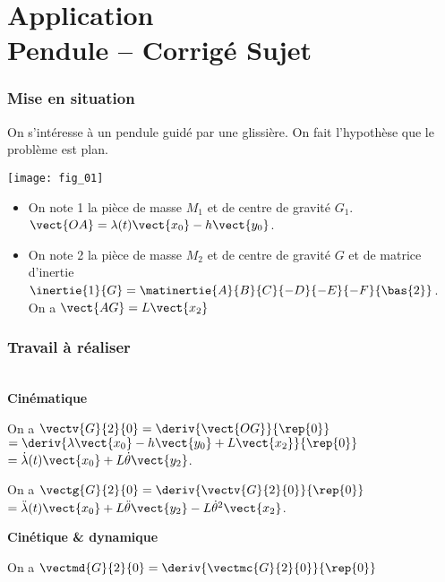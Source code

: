 \chapter*{Application  \\ 
Pendule -- \ifprof Corrigé \else Sujet \fi}

\iflivret {} \else
\ifprof  {} \else \fi
\fi

\setcounter{question}{0}
\marginnote{}



\subsection*{Mise en situation}
On s'intéresse à un pendule guidé par une glissière. On fait l'hypothèse que le problème est plan. 

\begin{marginfigure}
\texttt{[image: fig\_01]}
\end{marginfigure}

\begin{itemize}
\item On note 1 la pièce de masse $M_1$ et de centre de gravité $G_1$. $\vect{OA}=\lambda(t)\vect{x_0}-h\vect{y_0}$.
\item On note 2 la pièce de masse $M_2$ et de centre de gravité $G$ et de matrice d'inertie $\inertie{1}{G}= \matinertie{A}{B}{C}{-D}{-E}{-F}{\bas{2}}$. On a $\vect{AG}=L\vect{x_2}$
\end{itemize}

\subsection*{Travail à réaliser}

\ifprof
\begin{corrige}
~\\

\textbf{Cinématique}

On a $\vectv{G}{2}{0}=\deriv{\vect{OG}}{\rep{0}} $ 
$=\deriv{\lambda\vect{x_0}-h\vect{y_0}+L\vect{x_2}}{\rep{0}}$ 
$=\dot{\lambda}(t)\vect{x_0}+L\dot{\theta}\vect{y_2}$.



On a $\vectg{G}{2}{0}=\deriv{\vectv{G}{2}{0}}{\rep{0}} $ 
$=\ddot{\lambda}(t)\vect{x_0}+L\ddot{\theta}\vect{y_2}-L\dot{\theta}^2\vect{x_2}$.

\textbf{Cinétique \& dynamique}


On a $\vectmd{G}{2}{0} = \deriv{\vectmc{G}{2}{0}}{\rep{0}} $
\end{corrige}
\else
\fi



